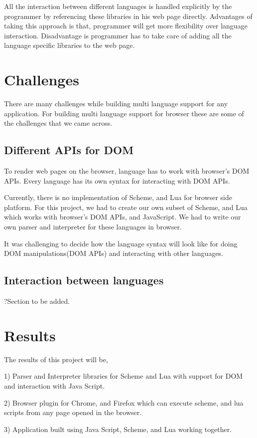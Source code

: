    All the interaction between different languages is handled explicitly by the programmer by referencing these libraries in his web page directly. Advantages of taking this approach is that, programmer will get more flexibility over language interaction. Disadvantage is programmer has to take care of adding all the language specific libraries to the web page.  

\section{Challenges}

There are many challenges while building multi language support for any application. For building multi language support for browser these are some of the challenges that we came across.

\subsection{Different APIs for DOM}

To render web pages on the browser, language has to work with browser's DOM APIs. Every language has its own syntax for interacting with DOM APIs. 


Currently, there is no implementation of Scheme, and Lua for browser side platform. For this project, we had to create our own subset of Scheme, and Lua which works with browser's DOM APIs, and JavaScript. We had to write our own parser and interpreter for these languages in browser.

It was challenging to decide how the language syntax will look like for doing DOM manipulations(DOM APIs) and interacting with other languages.



\subsection{Interaction between languages}

?Section to be added.


\section{Results}

The results of this project will be, 

1) Parser and Interpreter libraries for Scheme and Lua with support for DOM and interaction with Java Script.

2) Browser plugin for Chrome, and Firefox which can execute scheme, and lua scripts from any page opened in the browser.

3) Application built using Java Script, Scheme, and Lua working together.
